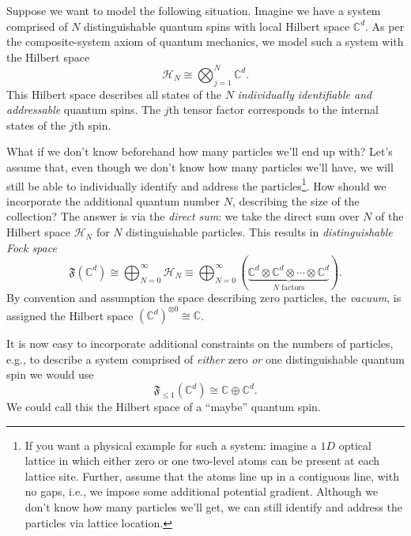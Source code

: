 Suppose we want to model the following situation. Imagine we have a system comprised of $N$ distinguishable quantum spins with local Hilbert space $\mathbb{C}^d$. As per the composite-system axiom of quantum mechanics, we model such a system with the Hilbert space
\begin{equation}
	\mathcal{H}_N \cong \bigotimes_{j=1}^N \mathbb{C}^d.
\end{equation}
This Hilbert space describes all states of the $N$ \emph{individually identifiable and addressable} quantum spins. The $j$th tensor factor corresponds to the internal states of the $j$th spin.

What if we don't know beforehand how many particles we'll end up with? Let's assume that, even though we don't know how many particles we'll have, we will still be able to individually identify and address the particles\footnote{If you want a physical example for such a system: imagine a $1D$ optical lattice in which either zero or one two-level atoms can be present at each lattice site. Further, assume that the atoms line up in a contiguous line, with no gaps, i.e., we impose some additional potential gradient. Although we don't know how many particles we'll get, we can still identify and address the particles via lattice location.}. How should we incorporate the additional quantum number $N$, describing the size of the collection? The answer is via the \emph{direct sum}: we take the direct sum over $N$ of the Hilbert space $\mathcal{H}_N$ for $N$ distinguishable particles. This results in \emph{distinguishable Fock space}
\begin{equation}
	\mathfrak{F}(\mathbb{C}^d) \cong \bigoplus_{N=0}^\infty \mathcal{H}_N\equiv \bigoplus_{N=0}^\infty (\underbrace{\mathbb{C}^d\otimes \mathbb{C}^d\otimes \cdots \otimes \mathbb{C}^d}_{\text{$N$ factors}}).
\end{equation}
By convention and assumption the space describing zero particles, the \emph{vacuum}, is assigned the Hilbert space $(\mathbb{C}^d)^{\otimes 0} \cong \mathbb{C}$.

It is now easy to incorporate additional constraints on the numbers of particles, e.g., to describe a system comprised of \emph{either} zero \emph{or} one distinguishable quantum spin we would use
\begin{equation}
	\mathfrak{F}_{\le 1} (\mathbb{C}^d) \cong \mathbb{C}\oplus \mathbb{C}^d.
\end{equation}
We could call this the Hilbert space of a ``maybe'' quantum spin.

